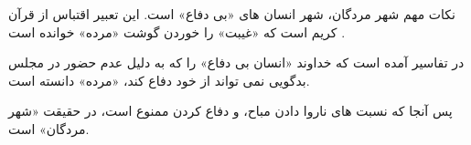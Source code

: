 \documentclass{Boostan-UserManual}
\begin{document}
\begin{goal}{نکات مهم}
شهر مردگان، شهر انسان های «بی دفاع» است. این تعبیر اقتباس از قرآن کریم است که «غیبت» را خوردن گوشت «مرده» خوانده است . 

در تفاسیر آمده است که خداوند «انسان بی دفاع» را که به دلیل عدم حضور در مجلس بدگویی نمی تواند از خود دفاع کند، «مرده» دانسته است.

  پس آنجا که نسبت های ناروا دادن مباح، و دفاع کردن ممنوع است، در حقیقت «شهر مردگان» است.
\end{goal}
\end{document}
